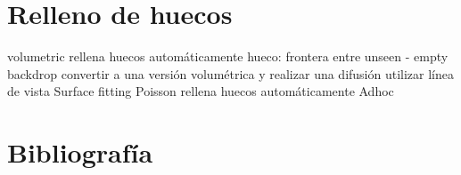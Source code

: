 \documentclass{pfc}
\begin{document}
	\section{Relleno de huecos}
		volumetric rellena huecos automáticamente
			hueco: frontera entre unseen - empty
			backdrop %
			convertir a una versión volumétrica y realizar una difusión
				utilizar línea de vista
		Surface fitting
		Poisson rellena huecos automáticamente
		Adhoc

\section{Bibliografía}

\end{document}
